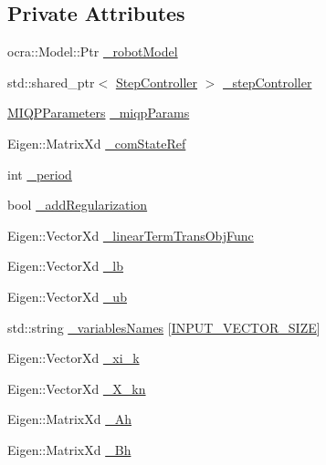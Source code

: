 \subsection*{\-Private \-Attributes}
\begin{DoxyCompactItemize}
\item 
ocra\-::\-Model\-::\-Ptr \hyperlink{classMIQPController_a03735ecec3242cdfc9bf8a443c561724}{\-\_\-robot\-Model}
\item 
std\-::shared\-\_\-ptr$<$ \hyperlink{classStepController}{\-Step\-Controller} $>$ \hyperlink{classMIQPController_a10018469a257136470ad9293fc3fe84a}{\-\_\-step\-Controller}
\item 
\hyperlink{structMIQPParameters}{\-M\-I\-Q\-P\-Parameters} \hyperlink{classMIQPController_a23f6caec48541df0ebe3f91189171ce5}{\-\_\-miqp\-Params}
\item 
\-Eigen\-::\-Matrix\-Xd \hyperlink{classMIQPController_ab74859a8dd208f3fc7608391d318d469}{\-\_\-com\-State\-Ref}
\item 
int \hyperlink{classMIQPController_aed2ce53008e32e64e107398d85e75170}{\-\_\-period}
\item 
bool \hyperlink{classMIQPController_ad64b7131a2a61bf8d3b18aec6ddd677a}{\-\_\-add\-Regularization}
\item 
\-Eigen\-::\-Vector\-Xd \hyperlink{classMIQPController_ac2ec0c5287589fe28f7381ebeaa5f4ef}{\-\_\-linear\-Term\-Trans\-Obj\-Func}
\item 
\-Eigen\-::\-Vector\-Xd \hyperlink{classMIQPController_ad3544c00f3515146c1818440905e36cc}{\-\_\-lb}
\item 
\-Eigen\-::\-Vector\-Xd \hyperlink{classMIQPController_aa8407451ad8b20c814b12fef631f43f6}{\-\_\-ub}
\item 
std\-::string \hyperlink{classMIQPController_a2c3ddd93fd843a3a4650314b47436be7}{\-\_\-variables\-Names} \mbox{[}\hyperlink{utils_8h_aa2f26540ce870ca91503bb6746a52e69}{\-I\-N\-P\-U\-T\-\_\-\-V\-E\-C\-T\-O\-R\-\_\-\-S\-I\-Z\-E}\mbox{]}
\item 
\-Eigen\-::\-Vector\-Xd \hyperlink{classMIQPController_ad1c63725dab2ce84382fcb0b071325ed}{\-\_\-xi\-\_\-k}
\item 
\-Eigen\-::\-Vector\-Xd \hyperlink{classMIQPController_a1fdfcba2c7b6422ac8d3b0b6095d7546}{\-\_\-\-X\-\_\-kn}
\item 
\-Eigen\-::\-Matrix\-Xd \hyperlink{classMIQPController_a388ed1c232c212e171276993b5cb3fec}{\-\_\-\-Ah}
\item 
\-Eigen\-::\-Matrix\-Xd \hyperlink{classMIQPController_a9a989875871a898f0ad19b441a2c67ba}{\-\_\-\-Bh}

\end{DoxyCompactItemize}
